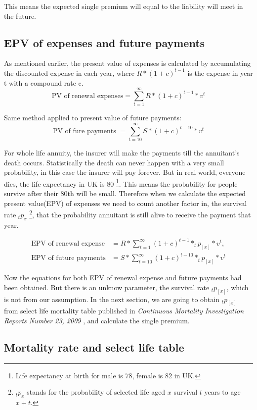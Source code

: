\documentclass{report}
\begin{document}
This means the expected single premium will equal to the liability will meet in the future.




\subsection{EPV of expenses and future payments}

As mentioned earlier, the present value of expenses is calculated by accumulating the discounted expense in each year, where  $R *(1 + c )^{t-1}$ is the expense in year t with a compound rate c.
\[
\text{PV of renewal expenses} = \sum_{t=1}^{\infty} R *(1 + c )^{t-1} *v^t
\]

Same method applied to present value of future payments:
\[
\text{PV of fure payments }= \sum_{t=10}^{\infty} S * (1 + c )^{t-10} * v^t 
\]

For whole life annuity, the insurer will make the payments till the annuitant's death occurs. Statistically the death can never happen with a very small probability, in this case the insurer will pay forever. But in real world, everyone dies, the life expectancy in UK is 80 \footnote{Life expectancy at birth for male is 78, female is 82 in UK.}. This means the probability for people survive after their 80th will be small. Therefore when we calculate the expected present value(EPV) of expenses we need to count another factor in, the survival rate $_tp_x$ \footnote{$_tp_x$ stands for the probability of selected life aged $x$ survival $t$ years to age $x+t$.}, that the probability annuitant is still alive to receive the payment that year.

\begin{align}
        \text{EPV of renewal expense}&= R  * \sum_{t=1}^{\infty}(1 + c )^{t-1} * _tp_{[x]}* v^t,\\
        \text{EPV of future payments}&= S * \sum_{t=10}^{\infty} (1 + c )^{t-10} * _tp_{[x]} * v^t
\end{align}


Now the equations for both EPV of renewal expense and future payments had been obtained. But there is an unknow parameter, the survival rate $_tp_{[x]}$, which is not from our assumption. In the next section, we are going to obtain $_tp_{[x]}$ from select life mortality table published in \textsl{Continuous Mortality Investigation Reports Number 23, 2009} \cite{bib:mortality-report}, and calculate the single premium.

\subsection{Mortality rate and select life table}
\end{document}
